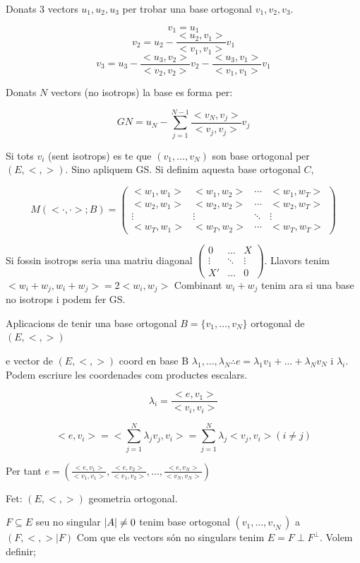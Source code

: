 \documentclass[12pt]{article}
\begin{document}
\noindent {}

Donats 3 vectors $u_1, u_2, u_3$ per trobar una base ortogonal $v_1,v_2,v_3$.

\[v_1 = u_1\]
\[v_2 = u_2 - \frac{<u_2,v_1>}{<v_1,v_1>}v_1\]
\[v_3 = u_3 - \frac{<u_3,v_2>}{<v_2,v_2>}v_2 - \frac{<u_3,v_1>}{<v_1,v_1>}v_1\]

Donats $N$ vectors (no isotrops) la base es forma per:

\[\boxed{GN = u_N - \sum_{j=1}^{N-1} \frac{<v_N,v_j>}{<v_j,v_j>}v_j}\]

Si tots $v_i$ (sent isotrops) es te que $(v_1, \dots, v_N)$ son base ortogonal per $(E, <,>)$. Sino apliquem GS. Si definim aquesta base ortogonal $C$,

\[
M(<\cdot,\cdot>;B)=
\begin{pmatrix}
< w_1,w_1> & < w_1,w_2> & \cdots & < w_1,w_T>\\
< w_2,w_1> & < w_2,w_2> & \cdots & < w_2,w_T>\\
\vdots & \vdots & \ddots & \vdots\\
< w_T,w_1> & < w_T,w_2> & \cdots & < w_T,w_T>
\end{pmatrix}
\]

Si fossin isotrops seria una matriu diagonal $\begin{pmatrix}
    0 & \dots & X\\
    \vdots & \ddots & \vdots \\
    X' & \dots & 0
\end{pmatrix}$. Llavors tenim $<w_i + w_j , w_i + w_j> = 2<w_i, w_j>$ Combinant $w_i + w_j$ tenim ara si una base no isotrops i podem fer GS.

Aplicacions de tenir una base ortogonal $B = \{v_1,\dots, v_N\}$ ortogonal de $(E,<,>)$

e vector de $(E, <,>)$ coord en base B $\lambda_1, \dots, \lambda_N \therefore e = \lambda_1v_1 + \dots+ \lambda_Nv_N$  i $\lambda_i$. Podem escriure les coordenades com productes escalars.

\[\lambda_i = \frac{<e,v_1>}{<v_i,v_i>}\]

\[<e,v_i>= <\sum_{j=1}^{N} \lambda_j v_j, v_i > =\sum_{j=1}^{N} \lambda_j <v_j, v_i> (i \neq j)\]

Per tant $e = (\frac{<e,v_1>}{<v_1,v_1>}, \frac{<e,v_2>}{<v_1,v_2>}, \dots, \frac{<e,v_N>}{<v_N,v_N>})$

\noindent Fet: $(E, <,>)$ geometria ortogonal.

$F \subseteq E$ seu no singular $\abs{A} \neq 0$ tenim base ortogonal $(v_1, \dots, v,_N)$ a $(F, <,>\mid F)$ Com que els vectors són no singulars tenim $E = F \perp F^{\perp}$. Volem definir;
\end{document}
